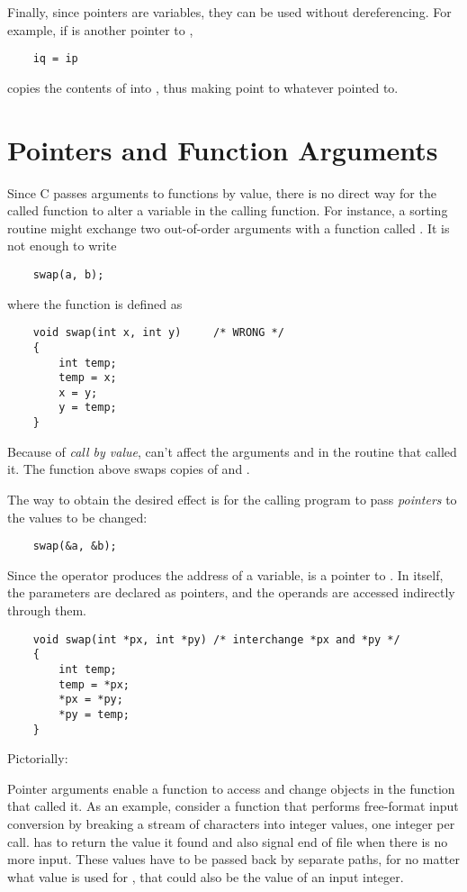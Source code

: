 Finally, since pointers are variables, they can be used without dereferencing. For example, if  is another pointer to ,
\begin{lstlisting}
	iq = ip
\end{lstlisting}
copies the contents of  into , thus making  point to whatever  pointed to.



\section{Pointers and Function Arguments}


Since C passes arguments to functions by value, there is no direct way for the called function to alter a variable in the calling function.
For instance, a sorting routine might exchange two out-of-order arguments with a function called . It is not enough to write
\begin{lstlisting}
	swap(a, b);
\end{lstlisting}
where the  function is defined as
\begin{lstlisting}
	void swap(int x, int y) 	/* WRONG */
	{
		int temp;
		temp = x;
		x = y;
		y = temp;
	}
\end{lstlisting}
Because of \emph{call by value},  can't affect the arguments  and  in the routine that called it.
The function above swaps copies of  and .


The way to obtain the desired effect is for the calling program to pass \emph{pointers} to the values to be changed:
\begin{lstlisting}
	swap(&a, &b);
\end{lstlisting}
Since the operator \code{\&} produces the address of a variable,  is a pointer to .
In  itself, the parameters are declared as pointers, and the operands are accessed indirectly through them.
\begin{lstlisting}
	void swap(int *px, int *py) /* interchange *px and *py */
	{
		int temp;
		temp = *px;
		*px = *py;
		*py = temp;
	}
\end{lstlisting}
Pictorially:


Pointer arguments enable a function to access and change objects in the function that called it.
As an example, consider a function  that performs free-format input conversion by breaking a stream of characters into integer values, one integer per call.
 has to return the value it found and also signal end of file when there is no more input.
These values have to be passed back by separate paths, for no matter what value is used for , that could also be the value of an input integer.


